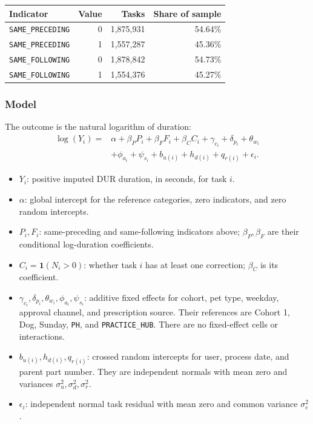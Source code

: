 \begin{center}
\begin{tabular}{@{}lrrr@{}}
\toprule
Indicator & Value & Tasks & Share of sample \\
\midrule
\texttt{SAME\_PRECEDING} & 0 & 1,875,931 & 54.64\% \\
\texttt{SAME\_PRECEDING} & 1 & 1,557,287 & 45.36\% \\
\texttt{SAME\_FOLLOWING} & 0 & 1,878,842 & 54.73\% \\
\texttt{SAME\_FOLLOWING} & 1 & 1,554,376 & 45.27\% \\
\bottomrule
\end{tabular}
\end{center}

\subsubsection{Model}
The outcome is the natural logarithm of duration:
\[
\begin{aligned}
\log(Y_i)={}&\alpha+\beta_P P_i+\beta_F F_i+\beta_C C_i
 +\gamma_{c_i}+\delta_{p_i}+\theta_{w_i}\\
&+\phi_{a_i}+\psi_{s_i}
 +b_{u(i)}+h_{d(i)}+q_{r(i)}+\epsilon_i .
\end{aligned}
\]
\begin{itemize}
\item \(Y_i\): positive imputed DUR duration, in seconds, for task \(i\).
\item \(\alpha\): global intercept for the reference categories, zero
indicators, and zero random intercepts.
\item \(P_i,F_i\): same-preceding and same-following indicators above;
\(\beta_P,\beta_F\) are their conditional log-duration coefficients.
\item \(C_i=\mathbf{1}(N_i>0)\): whether task \(i\) has at least one
correction; \(\beta_C\) is its coefficient.
\item \(\gamma_{c_i},\delta_{p_i},\theta_{w_i},\phi_{a_i},\psi_{s_i}\):
additive fixed effects for cohort, pet type, weekday, approval channel,
and prescription source. Their references are Cohort 1, Dog, Sunday,
\texttt{PH}, and \texttt{PRACTICE\_HUB}. There are no fixed-effect
cells or interactions.
\item \(b_{u(i)},h_{d(i)},q_{r(i)}\): crossed random intercepts for user,
process date, and parent part number. They are independent normals
with mean zero and variances \(\sigma_u^2,\sigma_d^2,\sigma_r^2\).
\item \(\epsilon_i\): independent normal task residual with mean zero
and common variance \(\sigma_e^2\).
\end{itemize}

